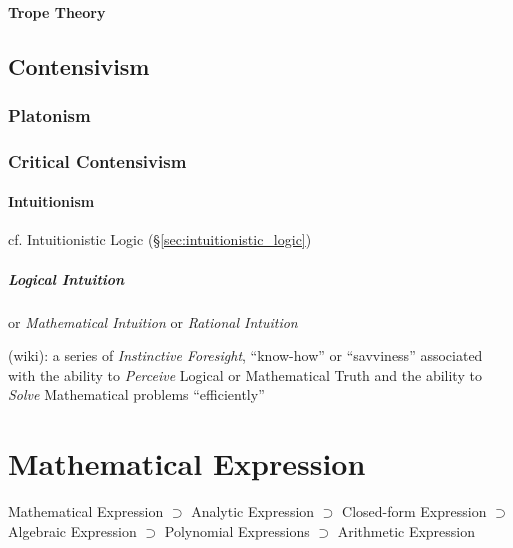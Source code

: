 \paragraph{Trope Theory}\label{sec:trope_theory}\hfill



\subsection{Contensivism}\label{sec:contensivism}

\subsubsection{Platonism}\label{sec:platonism}

\subsubsection{Critical Contensivism}\label{sec:critical_contensivism}

\paragraph{Intuitionism}\label{sec:intuitionism}\hfill

cf. Intuitionistic Logic (\S\ref{sec:intuitionistic_logic})



\subparagraph{Logical Intuition}\label{sec:logical_intuition}\hfill

or \emph{Mathematical Intuition} or \emph{Rational Intuition}

(wiki): a series of \emph{Instinctive Foresight}, ``know-how'' or ``savviness''
associated with the ability to \emph{Perceive} Logical or Mathematical Truth and
the ability to \emph{Solve} Mathematical problems ``efficiently''




\section{Mathematical Expression}\label{sec:mathematical_expression}

Mathematical Expression $\supset$
Analytic Expression     $\supset$
Closed-form Expression  $\supset$
Algebraic Expression    $\supset$
Polynomial Expressions  $\supset$
Arithmetic Expression

